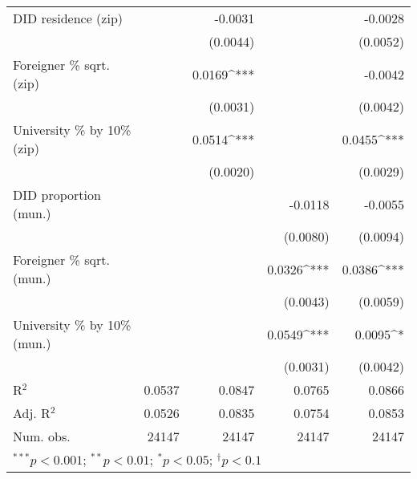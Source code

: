 \begin{tabular}{l D{.}{.}{5.11} D{.}{.}{5.7} D{.}{.}{5.7} D{.}{.}{5.7}}
DID residence (zip)               &                   & -0.0031       &               & -0.0028       \\
                                  &                   & (0.0044)      &               & (0.0052)      \\
Foreigner \% sqrt. (zip)          &                   & 0.0169^{***}  &               & -0.0042       \\
                                  &                   & (0.0031)      &               & (0.0042)      \\
University \% by 10\% (zip)       &                   & 0.0514^{***}  &               & 0.0455^{***}  \\
                                  &                   & (0.0020)      &               & (0.0029)      \\
DID proportion (mun.)             &                   &               & -0.0118       & -0.0055       \\
                                  &                   &               & (0.0080)      & (0.0094)      \\
Foreigner \% sqrt. (mun.)         &                   &               & 0.0326^{***}  & 0.0386^{***}  \\
                                  &                   &               & (0.0043)      & (0.0059)      \\
University \% by 10\% (mun.)      &                   &               & 0.0549^{***}  & 0.0095^{*}    \\
                                  &                   &               & (0.0031)      & (0.0042)      \\
\midrule
R$^2$                             & 0.0537            & 0.0847        & 0.0765        & 0.0866        \\
Adj. R$^2$                        & 0.0526            & 0.0835        & 0.0754        & 0.0853        \\
Num. obs.                         & 24147             & 24147         & 24147         & 24147         \\
\bottomrule
{}
\end{tabular}
